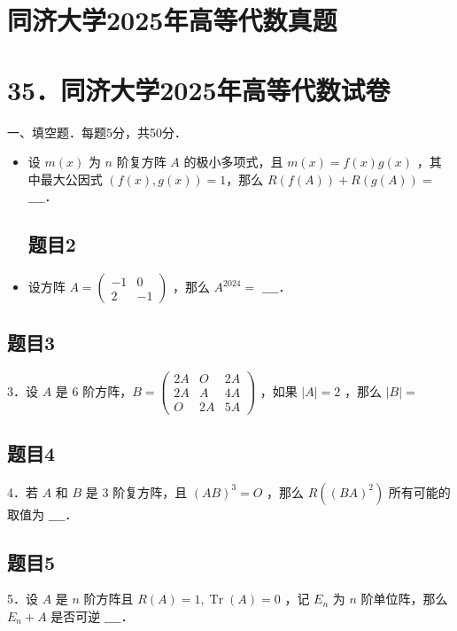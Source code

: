 \documentclass{article}
\begin{document}
\section*{同济大学2025年高等代数真题}
\section*{35．同济大学2025年高等代数试卷}
一、填空题．每题5分，共50分．

\begin{itemize}

\subsection{题目1}
  \item[1．] 设 \(m(x)\) 为 \(n\) 阶复方阵 \(A\) 的极小多项式，且 \(m(x)=f(x) g(x)\) ，其中最大公因式 \((f(x), g(x))=1\)，那么 \(R(f(A))+R(g(A))=\) \(\_\_\_\_\)．

\subsection{题目2}
  \item[2．] 设方阵 \(A=\left(\begin{array}{cc}-1 & 0 \\ 2 & -1\end{array}\right)\) ，那么 \(A^{2024}=\) \(\_\_\_\_\)．
\end{itemize}

\subsection{题目3}
3．设 \(A\) 是 6 阶方阵，\(B=\left(\begin{array}{ccc}2 A & O & 2 A \\ 2 A & A & 4 A \\ O & 2 A & 5 A\end{array}\right)\) ，如果 \(|A|=2\) ，那么 \(|B|=\)

\subsection{题目4}
4．若 \(A\) 和 \(B\) 是 3 阶复方阵，且 \((A B)^{3}=O\) ，那么 \(R\left((B A)^{2}\right)\) 所有可能的取值为 \(\_\_\_\_\)．

\subsection{题目5}
5．设 \(A\) 是 \(n\) 阶方阵且 \(R(A)=1, \operatorname{Tr}(A)=0\) ，记 \(E_{n}\) 为 \(n\) 阶单位阵，那么 \(E_{n}+A\) 是否可逆 \(\_\_\_\_\)．
\end{document}
